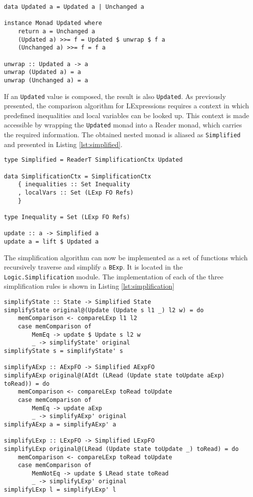 \documentclass[12pt]{article}
\begin{document}
\begin{lstlisting}[style=c0, caption=the Updated monad, label=lst:updated]
data Updated a = Updated a | Unchanged a

instance Monad Updated where
    return a = Unchanged a
    (Updated a) >>= f = Updated $ unwrap $ f a
    (Unchanged a) >>= f = f a

unwrap :: Updated a -> a
unwrap (Updated a) = a
unwrap (Unchanged a) = a
\end{lstlisting}

If an \texttt{Updated} value is composed, the result is also \texttt{Updated}.
As previously presented, the comparison algorithm for LExpressions requires a context in which predefined inequalities and local variables can be looked up.
This context is made accessible by wrapping the \texttt{Updated} monad into a Reader monad, which carries the required information.
The obtained nested monad is aliased as \texttt{Simplified} and presented in Listing \ref{lst:simplified}.

\begin{lstlisting}[style=c0, caption=the Simplified monad, label=lst:simplified]
type Simplified = ReaderT SimplificationCtx Updated

data SimplificationCtx = SimplificationCtx 
    { inequalities :: Set Inequality
    , localVars :: Set (LExp FO Refs)
    }
    
type Inequality = Set (LExp FO Refs)

update :: a -> Simplified a
update a = lift $ Updated a
\end{lstlisting}

The simplification algorithm can now be implemented as a set of functions which recursively traverse and simplify a \texttt{BExp}.
It is located in the \texttt{Logic.Simplification} module.
The implementation of each of the three simplification rules is shown in Listing \ref{lst:simplification}

\begin{lstlisting}[style=c0, caption=implementation of the simplification rules, label=lst:simplification]
simplifyState :: State -> Simplified State
simplifyState original@(Update (Update s l1 _) l2 w) = do
    memComparison <- compareLExp l1 l2
    case memComparison of
        MemEq -> update $ Update s l2 w
        _ -> simplifyState' original
simplifyState s = simplifyState' s

simplifyAExp :: AExpFO -> Simplified AExpFO
simplifyAExp original@(AIdt (LRead (Update state toUpdate aExp) toRead)) = do
    memComparison <- compareLExp toRead toUpdate
    case memComparison of
        MemEq -> update aExp
        _ -> simplifyAExp' original
simplifyAExp a = simplifyAExp' a

simplifyLExp :: LExpFO -> Simplified LExpFO
simplifyLExp original@(LRead (Update state toUpdate _) toRead) = do
    memComparison <- compareLExp toRead toUpdate
    case memComparison of
        MemNotEq -> update $ LRead state toRead 
        _ -> simplifyLExp' original
simplifyLExp l = simplifyLExp' l
\end{lstlisting}
\end{document}
